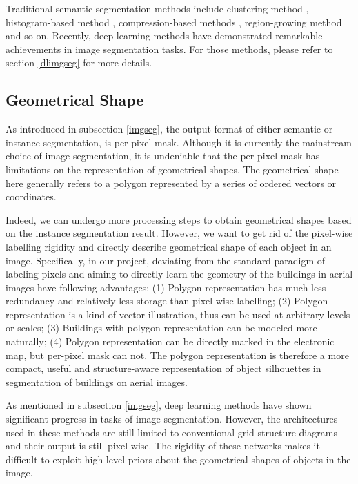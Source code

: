 Traditional semantic segmentation methods include clustering method \cite{imgsegclustering}, histogram-based method \cite{cvbookstockman}, compression-based methods \cite{imgsegcompress}, region-growing method \cite{imgsegregion} and so on. Recently, deep learning methods have demonstrated remarkable achievements in image segmentation tasks. For those methods, please refer to section \ref{dlimgseg} for more details.

\subsection{Geometrical Shape}\label{geosha}
As introduced in subsection \ref{imgseg}, the output format of either semantic or instance segmentation, is per-pixel mask. Although it is currently the mainstream choice of image segmentation, it is undeniable that the per-pixel mask has limitations on the representation of geometrical shapes. The geometrical shape here generally refers to a polygon represented by a series of ordered vectors or coordinates.

Indeed, we can undergo more processing steps to obtain geometrical shapes based on the instance segmentation result. However, we want to get rid of the pixel-wise labelling rigidity and directly describe geometrical shape of each object in an image. Specifically, in our project, deviating from the standard paradigm of labeling pixels and aiming to directly learn the geometry of the buildings in aerial images have following advantages: (1) Polygon representation has much less redundancy and relatively less storage than pixel-wise labelling; (2) Polygon representation is a kind of vector illustration, thus can be used at arbitrary levels or scales; (3) Buildings with polygon representation can be modeled more naturally; (4) Polygon representation can be directly marked in the electronic map, but per-pixel mask can not. The polygon representation is therefore a more compact, useful and structure-aware representation of object silhouettes in segmentation of buildings on aerial images.

As mentioned in subsection \ref{imgseg}, deep learning methods have shown significant progress in tasks of image segmentation. However, the architectures used in these methods are still limited to conventional grid structure diagrams and their output is still pixel-wise. The rigidity of these networks makes it difficult to exploit high-level priors about the geometrical shapes of objects in the image. 

